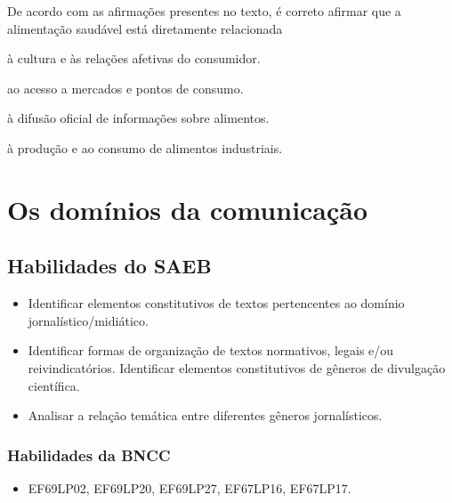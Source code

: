 De acordo com as afirmações presentes no texto, é correto afirmar que a alimentação saudável
está diretamente relacionada

\begin{escolha}

  \item à cultura e às relações afetivas do consumidor.
  
  \item ao acesso a mercados e pontos de consumo.
  
  \item à difusão oficial de informações sobre alimentos.
  
  \item à produção e ao consumo de alimentos industriais.

\end{escolha}

\chapter{Os domínios da comunicação}

\section*{Habilidades do SAEB}

\begin{itemize}

  \item Identificar elementos constitutivos de textos pertencentes ao
domínio jornalístico/midiático.

  \item Identificar formas de organização de textos normativos, legais e/ou
reivindicatórios. Identificar elementos constitutivos de gêneros de
divulgação científica.

  \item Analisar a relação temática entre diferentes gêneros jornalísticos.

\end{itemize}

\subsection{Habilidades da BNCC}

\begin{itemize}
  
  \item EF69LP02, EF69LP20, EF69LP27, EF67LP16, EF67LP17.

\end{itemize}

